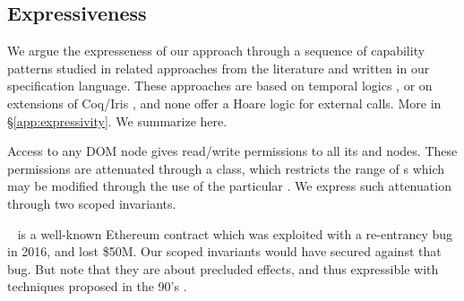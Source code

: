 \newcommand{\paragraphSDD}[1]{\vspace{.02cm}{\textit{#1}}}
 
\subsection{Expressiveness} 

We argue the expresseness of our approach  through a sequence of capability patterns studied in related approaches from the literature  
 \cite{OOPSLA22,dd,VerX,irisWasm23,ddd} and written in our specification language.
These approaches %
 are based on temporal logics \cite{VerX,OOPSLA22}, or on extensions of Coq/Iris \cite{dd,irisWasm23,ddd}, and
none offer a Hoare logic    for external calls.
More in  \S \ref{app:expressivity}. 
We   summarize here.

 

\paragraphSDD{DOM} %
Access to any DOM node
gives read/write  permissions to  all its  and  nodes. 
These permissions are attenuated   through a  class, %
 which restricts the range of s which may be modified through the use of the particular . 
We  express such  attenuation   through two scoped invariants.

\paragraphSDD{DAO} %
 ~\cite{Dao}  is a well-known Ethereum contract   which was exploited with a re-entrancy bug in 2016, 
and lost \$50M. 
Our scoped invariants  would have secured %
 against that bug. %
But note  that  they are about precluded effects, and 
thus expressible %
 with techniques proposed in the 90's \cite{MeyerDBC92}.
 
